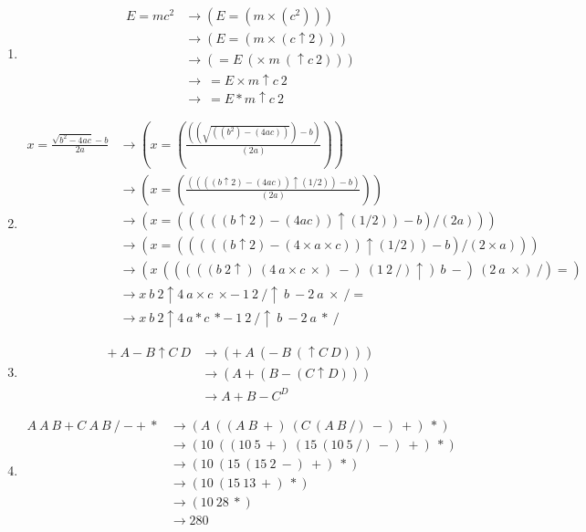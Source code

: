 \documentclass[12pt,letterpaper,fleqn]{article}
\begin{document}
\begin{enumerate}

\item \begin{align*}
  E = mc^2 &\rightarrow (E = (m \times (c^2))) \\
  &\rightarrow (E = (m \times (c \uparrow 2))) \\
  &\rightarrow (= E\ (\times\ m\ (\uparrow c\ 2))) \\
  &\rightarrow\ = E \times m \uparrow c\ 2 \\
  &\rightarrow\ = E * m \uparrow c\ 2
\end{align*}

\item \begin{align*}
  x = \frac{\sqrt{b^2 - 4ac} - b}{2a} &\rightarrow \left(x = \left(\frac{\left(\left(\sqrt{((b^2) - (4ac))}\right) - b\right)}{(2a)}\right)\right) \\
  &\rightarrow \left(x = \left(\frac{\left(\left(((b \uparrow 2) - (4ac)) \uparrow (1/2) \right) - b\right)}{(2a)}\right)\right) \\
  &\rightarrow (x = (((((b \uparrow 2) - (4ac)) \uparrow (1/2)) - b) / (2a))) \\
  &\rightarrow (x = (((((b \uparrow 2) - (4 \times a \times c)) \uparrow (1/2)) - b) / (2 \times a))) \\
  &\rightarrow (x\ (((((b\ 2 \uparrow)\ (4\ a \times c\ \times)\ -)\ (1\ 2\ /) \uparrow)\ b\ -)\ (2\ a\ \times)\ /) =) \\
  &\rightarrow x\ b\ 2 \uparrow 4\ a \times c\ \times -\ 1\ 2\ / \uparrow\ b\ - 2\ a\ \times\ / = \\
  &\rightarrow x\ b\ 2 \uparrow 4\ a * c\ * -\ 1\ 2\ / \uparrow\ b\ - 2\ a\ *\ /
\end{align*}

\item \begin{align*}
  +\ A - B \uparrow C\ D &\rightarrow (+\ A\ (-\ B\ (\uparrow C\ D))) \\
  &\rightarrow (A + (B - (C \uparrow D))) \\
  &\rightarrow A + B - C^D
\end{align*}

\item \begin{align*}
  A\ A\ B + C\ A\ B\ / - +\ * &\rightarrow (A\ ((A\ B\ +)\ (C\ (A\ B\ /)\ -)\ +)\ *) \\
  &\rightarrow (10\ ((10\ 5\ +)\ (15\ (10\ 5\ /)\ -)\ +)\ *) \\
  &\rightarrow (10\ (15\ (15\ 2\ -)\ +)\ *) \\
  &\rightarrow (10\ (15\ 13\ +)\ *) \\
  &\rightarrow (10\ 28\ *) \\
  &\rightarrow 280
\end{align*}

\end{enumerate}
\end{document}
